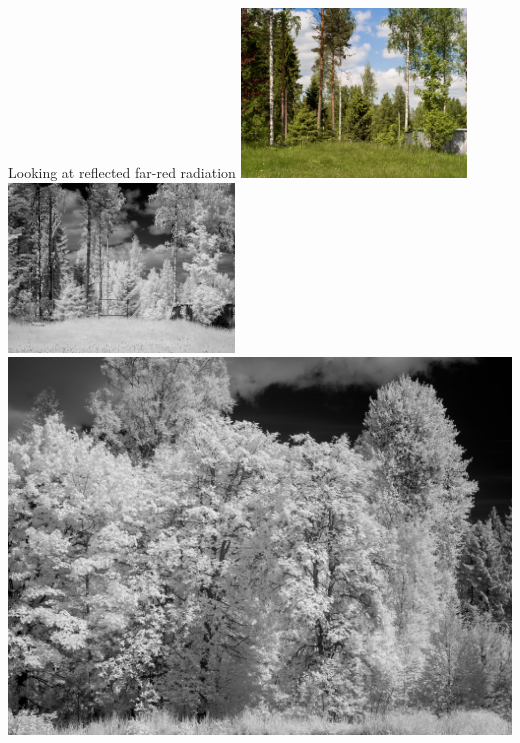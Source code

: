 \documentclass[10pt]{beamer}\usepackage[]{graphicx}\usepackage[]{color}
\begin{document}
\begin{frame}{Looking at reflected far-red radiation}
    \centering
    \includegraphics[width=0.45\textwidth]{photos/visible}\ %
    \includegraphics[width=0.45\textwidth]{photos/far-red-1}\\[0.5ex]
    \includegraphics[height=0.45\textheight]{photos/far-red-2}\ %

\end{frame}
\end{document}
